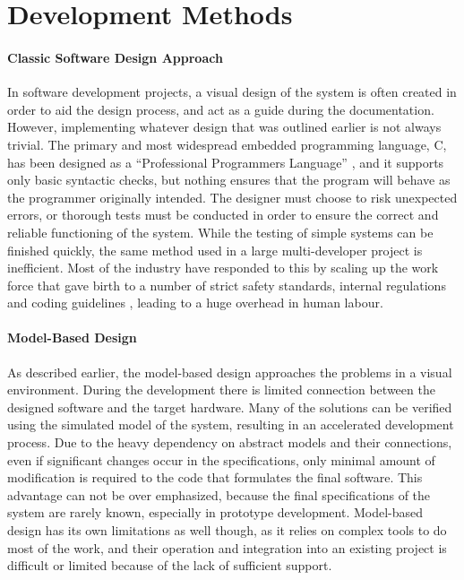 \section{Development Methods}

\paragraph{Classic Software Design Approach}

In software development projects, a visual design of the system is often created in order to aid the design process, and act as a guide during the documentation. However, implementing whatever design that was outlined earlier is not always trivial. The primary and most widespread embedded programming language, \textsf{C}, has been designed as a “Professional Programmers Language” \cite{essentialc}, and it supports only basic syntactic checks, but nothing ensures that the program will behave as the programmer originally intended. The designer must choose to risk unexpected errors, or thorough tests must be conducted in order to ensure the correct and reliable functioning of the system. While the testing of simple systems can be finished quickly, the same method used in a large multi-developer project is inefficient. Most of the industry have responded to this by scaling up the work force that gave birth to a number of strict safety standards, internal regulations and coding guidelines \cite{misra}, leading to a huge overhead in human labour.

\paragraph{Model-Based Design}

As described earlier, the model-based design approaches the problems in a visual environment. During the development there is limited connection between the designed software and the target hardware. Many of the solutions can be verified using the simulated model of the system, resulting in an accelerated development process\cite{locomotive}.
Due to the heavy dependency on abstract models and their connections, even if significant changes occur in the specifications, only minimal amount of modification is required to the code that formulates the final software. This advantage can not be over emphasized, because the final specifications of the system are rarely known, especially in prototype development.
Model-based design has its own limitations as well though, as it relies on complex tools to do most of the work, and their operation and integration into an existing project is difficult or limited because of the lack of sufficient support.

